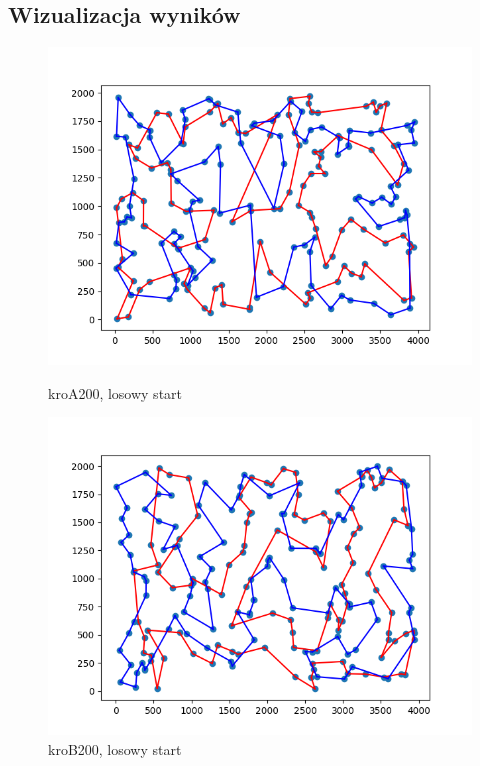 \documentclass[11pt]{article}
\begin{document}
\subsection{Wizualizacja wyników}\label{subsec:wizualizacja-wynikow}
\begin{figure}[H]
    \centering
    \begin{minipage}[t]{0.45\textwidth}
        \centering
        \includegraphics[width=\linewidth]{best_paths/kroA200/traverse_greedy/randomstart}
        \caption{kroA200, losowy start}
    \end{minipage}
    \hfill
    \begin{minipage}[t]{0.45\textwidth}
        \centering
        \includegraphics[width=\linewidth]{best_paths/kroB200/traverse_greedy/randomstart}
        \caption{kroB200, losowy start}
    \end{minipage}


\end{figure}
\end{document}
